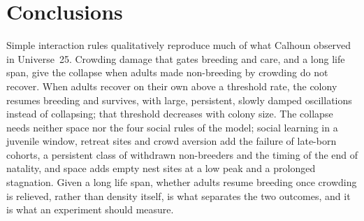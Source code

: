 \section{Conclusions}
\label{sec:conclusions}

Simple interaction rules qualitatively reproduce much of what Calhoun observed in Universe~25. Crowding damage that gates
breeding and care, and a long life span, give the collapse when adults made non-breeding by crowding do not recover.
When adults recover on their own above a threshold rate, the colony resumes breeding and survives, with large,
persistent, slowly damped oscillations instead of collapsing; that threshold decreases with colony size. The collapse
needs neither space nor the four social rules of the model; social learning in a juvenile window, retreat sites and
crowd aversion add the failure of late-born cohorts, a persistent class of withdrawn non-breeders and the timing of
the end of natality, and space adds empty nest sites at a low peak and a prolonged stagnation. Given a long life span, whether adults
resume breeding once crowding is relieved, rather than density itself, is what separates the two outcomes, and it is what
an experiment should measure.
